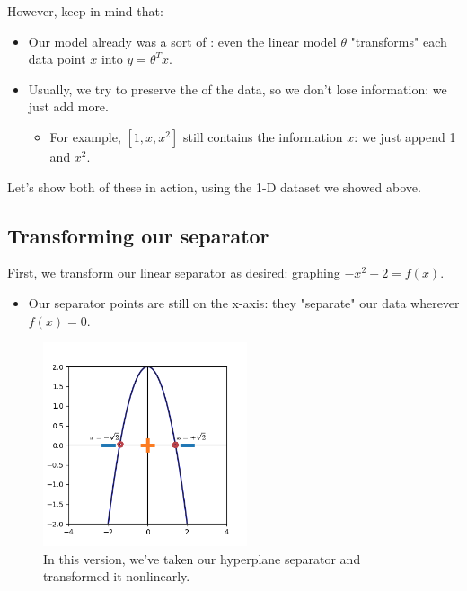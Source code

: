         However, keep in mind that:

        \begin{itemize}
            \item Our model already was a sort of : even the linear model $\theta$ "transforms" each data point $x$ into $y=\theta^T x$.
            
            \item Usually, we try to preserve the  of the data, so we don't lose information: we just add more.
                \begin{itemize}
                    \item For example, $[1,x,x^2]$ still contains the information $x$: we just append 1 and $x^2$.
                \end{itemize}
        \end{itemize}

        \miniex Let's show both of these in action, using the 1-D dataset we showed above.

        \subsecdiv

        \subsection{Transforming our separator}
    
            First, we transform our linear separator as desired: graphing $-x^2+2=f(x)$.

            \begin{itemize}
                \item Our separator points are still on the x-axis: they "separate" our data wherever $f(x)=0$.
            \end{itemize}
    
            \begin{figure}[H]
                \centering
                \includegraphics[width=60mm,scale=0.5]{images/feature_images/nonlinear_separator.png}
                \caption*{In this version, we've taken our hyperplane separator and transformed it nonlinearly.}
            \end{figure}
    
